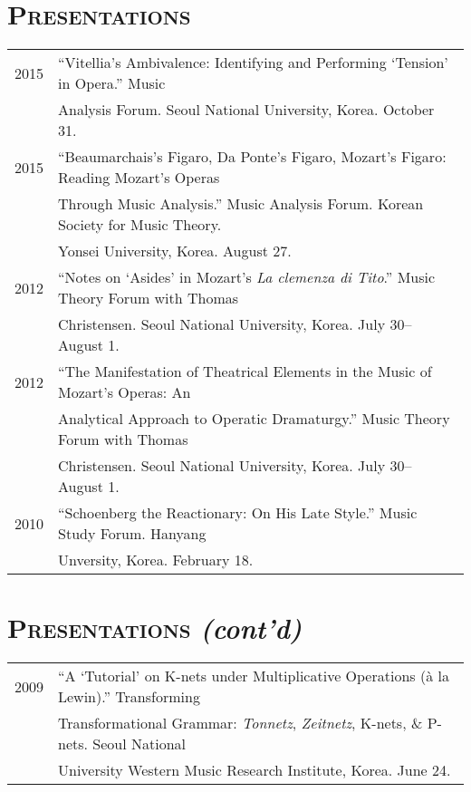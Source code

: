 \documentclass[letter,11pt,draft]{article}
\begin{document}
  \vspace{2.5mm}
  
  \section*{\textsc{Presentations}}
  
  \hspace*{-0.25cm}
  \begin{tabular}{p{2.5cm} p{12.5cm}}
  2015 & ``Vitellia’s Ambivalence: Identifying and Performing ‘Tension’ in Opera.'' Music\\
  & Analysis Forum. Seoul National University, Korea. October 31.\\[2mm]
  
  2015 & ``Beaumarchais's Figaro, Da Ponte's Figaro, Mozart's Figaro: Reading Mozart's Operas\\
  & Through Music Analysis.'' Music Analysis Forum. Korean Society for Music Theory.\\
  & Yonsei University, Korea. August 27.\\[2mm]
  
  2012 & “Notes on ‘Asides’ in Mozart’s \textit{La clemenza di Tito}.” Music Theory Forum with Thomas\\
  & Christensen. Seoul National University, Korea. July 30–August 1.\\[2mm]

  2012 & “The Manifestation of Theatrical Elements in the Music of Mozart’s Operas: An\\
  & Analytical Approach to Operatic Dramaturgy.” Music Theory Forum with Thomas\\
  & Christensen. Seoul National University, Korea. July 30–August 1.\\[2mm]

  2010 & “Schoenberg the Reactionary: On His Late Style.” Music Study Forum. Hanyang\\
  & Unversity, Korea. February 18.
  \end{tabular}
  
  \vspace{2.5mm}
  
  \section*{\textsc{Presentations} \textit{(cont'd)}}
  
  \hspace*{-0.25cm}
  \begin{tabular}{p{2.5cm} p{12.5cm}}
  2009 & “A ‘Tutorial’ on K-nets under Multiplicative Operations (à la Lewin).” Transforming\\
  & Transformational Grammar: \textit{Tonnetz}, \textit{Zeitnetz}, K-nets, \& P-nets. Seoul National\\
  & University Western Music Research Institute, Korea. June 24.
  \end{tabular}
  
\end{document}
